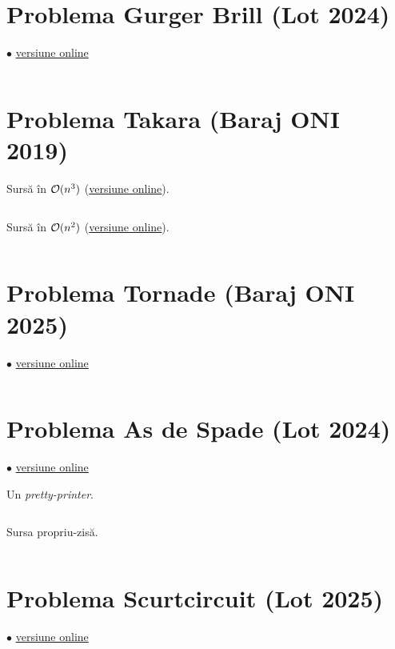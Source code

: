 \documentclass[../main.tex]{subfiles}
\begin{document}
\inputminted{cpp}{../src/assorted/subiectul-iii.cpp}


\section{Problema Gurger Brill (Lot 2024)}
\label{code:gurger-brill}
$\bullet$
\href{https://kilonova.ro/submissions/1161780}{versiune online}

\inputminted{cpp}{../src/assorted/gurger-brill.cpp}


\section{Problema Takara (Baraj ONI 2019)}
\label{code:takara}

Sursă în $\mathcal{O}(n^3)$ (\href{https://kilonova.ro/submissions/1158983}{versiune online}).

\inputminted{cpp}{../src/assorted/takara-n3.cpp}

Sursă în $\mathcal{O}(n^2)$ (\href{https://kilonova.ro/submissions/1160687}{versiune online}).

\inputminted{cpp}{../src/assorted/takara-n2.cpp}


\section{Problema Tornade (Baraj ONI 2025)}
\label{code:tornade}
$\bullet$
\href{https://kilonova.ro/submissions/723667}{versiune online}

\inputminted{cpp}{../src/assorted/tornade.cpp}

\section{Problema As de Spade (Lot 2024)}
\label{code:as-de-spade}
$\bullet$
\href{https://kilonova.ro/submissions/1162152}{versiune online}

Un \textit{pretty-printer}.

\inputminted{cpp}{../src/assorted/as-de-spade-pretty-printer.cpp}

Sursa propriu-zisă.

\inputminted{cpp}{../src/assorted/as-de-spade.cpp}


\section{Problema Scurtcircuit (Lot 2025)}
\label{code:scurtcircuit}
$\bullet$
\href{https://kilonova.ro/submissions/793314}{versiune online}
\end{document}
